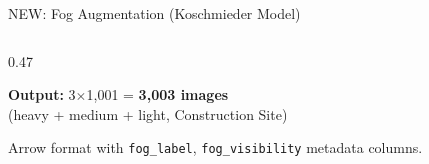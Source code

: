\documentclass[aspectratio=169, 10pt]{beamer}
\begin{document}
\begin{frame}{NEW: Fog Augmentation (Koschmieder Model)}
\begin{columns}[T]
\begin{column}{0.47\textwidth}

\vspace{0.5em}
\textbf{Output:} 3$\times$1,001 = \textbf{3,003 images}\\
{\scriptsize (heavy + medium + light, Construction Site)}

\vspace{0.3em}
{\scriptsize Arrow format with \texttt{fog\_label}, \texttt{fog\_visibility} metadata columns.}
\end{column}
\end{columns}
\end{frame}

\end{document}
